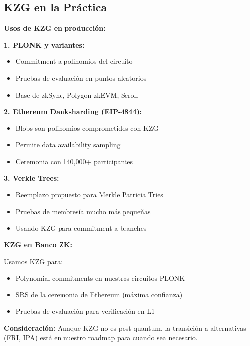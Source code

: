 \documentclass[11pt,a4paper,twoside]{book}
\begin{document}
\subsection{KZG en la Pr\'actica}

\begin{remark}
\textbf{Usos de KZG en producci\'on:}

\textbf{1. PLONK y variantes:}
\begin{itemize}
    \item Commitment a polinomios del circuito
    \item Pruebas de evaluaci\'on en puntos aleatorios
    \item Base de zkSync, Polygon zkEVM, Scroll
\end{itemize}

\textbf{2. Ethereum Danksharding (EIP-4844):}
\begin{itemize}
    \item Blobs son polinomios comprometidos con KZG
    \item Permite data availability sampling
    \item Ceremonia con 140,000+ participantes
\end{itemize}

\textbf{3. Verkle Trees:}
\begin{itemize}
    \item Reemplazo propuesto para Merkle Patricia Tries
    \item Pruebas de membres\'ia mucho m\'as peque\~nas
    \item Usando KZG para commitment a branches
\end{itemize}
\end{remark}

\begin{bancozk}
\textbf{KZG en Banco ZK:}

Usamos KZG para:
\begin{itemize}
    \item Polynomial commitments en nuestros circuitos PLONK
    \item SRS de la ceremonia de Ethereum (m\'axima confianza)
    \item Pruebas de evaluaci\'on para verificaci\'on en L1
\end{itemize}

\textbf{Consideraci\'on:} Aunque KZG no es post-quantum, la transici\'on a alternativas (FRI, IPA) est\'a en nuestro roadmap para cuando sea necesario.
\end{bancozk}
\end{document}
